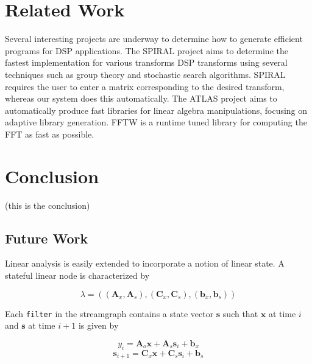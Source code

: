 \section{Related Work}
\label{sec:related}

Several interesting projects are underway to determine how to generate
efficient programs for DSP applications. The SPIRAL
project\cite{spiral,xiong-thesis,xiong01spl,johnson01searching,egner01automatic}
aims to determine the fastest implementation for various transforms
DSP transforms using several techniques such as group theory and
stochastic search algorithms. SPIRAL requires the user to enter a
matrix corresponding to the desired transform, whereas our system does
this automatically.  The ATLAS project \cite{whaley01automated} aims
to automatically produce fast libraries for linear algebra
manipulations, focusing on adaptive library generation.  FFTW
\cite{frigo99fast, fftw} is a runtime tuned library for computing the
FFT as fast as possible.


\section{Conclusion}
\label{sec:conclusion}

(this is the conclusion)



\subsection{Future Work}

Linear analysis is easily extended to incorporate a notion of linear state.
A stateful linear node is characterized by

\begin{equation} \nonumber
\lambda=(({\mathbf A}_x, {\mathbf A}_s), ({\mathbf C}_x, {\mathbf C}_s), 
({\mathbf b}_x, {\mathbf b}_s))
\end{equation}

Each {\tt filter} in the streamgraph contains a state vector ${\mathbf s}$
such that ${\mathbf x}$ at time $i$ and ${\mathbf s}$ at time $i+1$ is given by

\begin{equation} \nonumber
y_i={\mathbf A}_o{\mathbf x} + {\mathbf A}_s{\mathbf s}_i + {\mathbf b}_x
\end{equation}
\begin{equation} \nonumber
{\mathbf s}_{i+1}={\mathbf C}_x{\mathbf x} + {\mathbf C}_s{\mathbf s}_i + {\mathbf b}_s
\end{equation}

